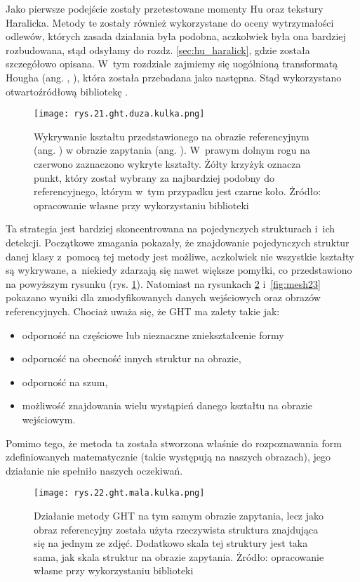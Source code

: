 Jako pierwsze podejście zostały przetestowane momenty Hu oraz tekstury Haralicka. Metody te zostały również wykorzystane do oceny wytrzymałości odlewów, których zasada działania była podobna, aczkolwiek była ona bardziej rozbudowana, stąd odsyłamy do rozdz. \ref{sec:hu_haralick}, gdzie została szczegółowo opisana. W~tym rozdziale zajmiemy się uogólnioną transformatą Hougha (ang. , ), która została przebadana jako następna. Stąd wykorzystano otwartoźródłową bibliotekę  \cite{generalhough}.
\begin{figure}[h]
    \centering
    \texttt{[image: rys.21.ght.duza.kulka.png]}
    \caption{Wykrywanie kształtu przedstawionego na obrazie referencyjnym (ang. ) w obrazie zapytania (ang. ). W~prawym dolnym rogu na czerwono zaznaczono wykryte kształty. Żółty krzyżyk oznacza punkt, który został wybrany za najbardziej podobny do referencyjnego, którym w~tym przypadku jest czarne koło. Żródło: opracowanie własne przy wykorzystaniu biblioteki }
    \label{fig:mesh21}
\end{figure}
Ta strategia jest bardziej skoncentrowana na pojedynczych strukturach i~ich detekcji. Początkowe zmagania pokazały, że znajdowanie pojedynczych struktur danej klasy z~pomocą tej metody jest możliwe, aczkolwiek nie wszystkie kształty są wykrywane, a~niekiedy zdarzają się nawet większe pomyłki, co przedstawiono na powyższym rysunku (rys. \ref{fig:mesh21}). Natomiast na rysunkach \ref{fig:mesh22} i~\ref{fig:mesh23} pokazano wyniki dla zmodyfikowanych danych wejściowych oraz obrazów referencyjnych. Chociaż uważa się, że GHT ma zalety takie jak:
\begin{itemize}
	\item odporność na częściowe lub nieznaczne zniekształcenie formy
	\item odporność na obecność innych struktur na obrazie,
	\item odporność na szum,
	\item możliwość znajdowania wielu wystąpień danego kształtu na obrazie wejściowym.
\end{itemize}
Pomimo tego, że metoda ta została stworzona właśnie do rozpoznawania form zdefiniowanych matematycznie (takie występują na naszych obrazach), jego działanie nie spełniło naszych oczekiwań.
\begin{figure}[h]
    \centering
    \texttt{[image: rys.22.ght.mala.kulka.png]}
    \caption{Działanie metody GHT na tym samym obrazie zapytania, lecz jako obraz referencyjny została użyta rzeczywista struktura znajdująca się na jednym ze zdjęć. Dodatkowo skala tej struktury jest taka sama, jak skala struktur na obrazie zapytania. Żródło: opracowanie własne przy wykorzystaniu biblioteki }
    \label{fig:mesh22}
\end{figure}
